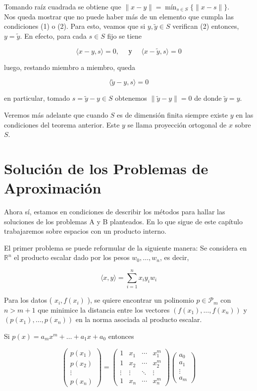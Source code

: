 \documentclass[10pt]{book}
\begin{document}
Tomando raíz cuadrada se obtiene que $\|x-y\|=\operatorname{mín}_{s \in S}\{\|x-s\|\}$.\\
Nos queda mostrar que no puede haber más de un elemento que cumpla las condiciones (1) o (2). Para esto, veamos que si $y, \widetilde{y} \in S$ verifican (2) entonces, $y=\widetilde{y}$. En efecto, para cada $s \in S$ fijo se tiene

$$
\langle x-y, s\rangle=0, \quad \text { у } \quad\langle x-\widetilde{y}, s\rangle=0
$$

luego, restando miembro a miembro, queda

$$
\langle\widetilde{y}-y, s\rangle=0
$$

en particular, tomado $s=\widetilde{y}-y \in S$ obtenemos $\|\widetilde{y}-y\|=0$ de donde $\widetilde{y}=y$.

Veremos más adelante que cuando $S$ es de dimensión finita siempre existe $y$ en las condiciones del teorema anterior. Este $y$ se llama proyección ortogonal de $x$ sobre $S$.

\section{Solución de los Problemas de Aproximación}
Ahora sí, estamos en condiciones de describir los métodos para hallar las soluciones de los problemas A y B planteados. En lo que sigue de este capítulo trabajaremos sobre espacios con un producto interno.

El primer problema se puede reformular de la siguiente manera: Se considera en $\mathbb{R}^{n}$ el producto escalar dado por los pesos $w_{0}, \ldots, w_{n}$, es decir,

$$
\langle x, y\rangle=\sum_{i=1}^{n} x_{i} y_{i} w_{i}
$$

Para los datos ( $x_{i}, f\left(x_{i}\right)$ ), se quiere encontrar un polinomio $p \in \mathcal{P}_{m}$ con $n>m+1$ que minimice la distancia entre los vectores $\left(f\left(x_{1}\right), \ldots, f\left(x_{n}\right)\right)$ y $\left(p\left(x_{1}\right), \ldots, p\left(x_{n}\right)\right)$ en la norma asociada al producto escalar.

Si $p(x)=a_{m} x^{m}+\ldots+a_{1} x+a_{0}$ entonces

\[
\left(\begin{array}{c}
p\left(x_{1}\right)  \tag{6.2}\\
p\left(x_{2}\right) \\
\vdots \\
p\left(x_{n}\right)
\end{array}\right)=\left(\begin{array}{cccc}
1 & x_{1} & \cdots & x_{1}^{m} \\
1 & x_{2} & \cdots & x_{2}^{m} \\
\vdots & \vdots & \ddots & \vdots \\
1 & x_{n} & \cdots & x_{n}^{m}
\end{array}\right)\left(\begin{array}{c}
a_{0} \\
a_{1} \\
\vdots \\
a_{m}
\end{array}\right)
\]
\end{document}
